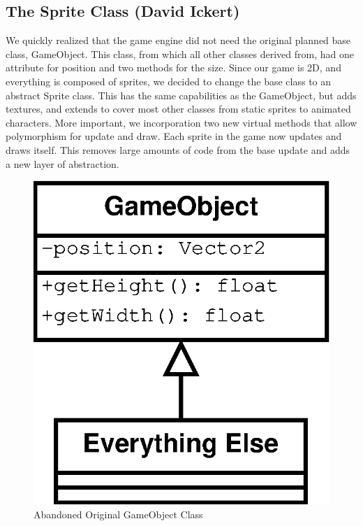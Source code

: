 \documentclass[]{article}
\begin{document}
		\subsection{The Sprite Class (David Ickert)}
			We quickly realized that the game engine did not need the original planned base class, GameObject.  This class, from which all other classes derived from, had one attribute for position and two methods for the size.  Since our game is 2D, and everything is composed of sprites, we decided to change the base class to an abstract Sprite class.  This has the same capabilities as the GameObject, but adds textures, and extends to cover most other classes from static sprites to animated characters.  More important, we incorporation two new virtual methods that allow polymorphism for update and draw.  Each sprite in the game now updates and draws itself.  This removes large amounts of code from the base update and adds a new layer of abstraction.
			\begin{figure}[H]
				\centering
				\includegraphics[scale=0.50]{UML/GameObject}
				\caption{Abandoned Original GameObject Class}				
			\end{figure}
\end{document}
